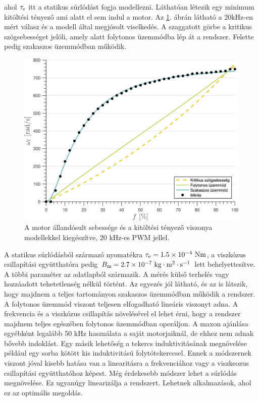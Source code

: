 ahol \(\tau_{\mathrm{e}}\) itt a statikus súrlódást fogja modellezni. Láthatóan létezik egy minimum kitöltési tényező 
ami alatt el sem indul a motor. 
Az \ref{fig:motor_response_20khz_with_model}. ábrán látható a 20kHz-en mért válasz és a modell által megjósolt viselkedés. 
A szaggatott görbe a kritikus szögsebességet jelöli, amely alatt folytonos üzemmódba lép át a rendszer. Felette pedig szakaszos üzemmódban működik. 
\begin{figure}[H]
    \begin{center}
    \includegraphics[width=\textwidth]{images/motor_pwm_response20_with_model.png}
    \caption{A motor állandósult sebessége és a kitöltési tényező viszonya modellekkel kiegészítve, 20 kHz-es PWM jellel.}\label{fig:motor_response_20khz_with_model}
    \end{center}
\end{figure}
A statikus súrlódásból származó nyomatékra \(\tau_{\mathrm{e}} = 1.5 \times 10^{-4}~\mathrm{Nm}\), a viszkózus csillapítási együtthatóra pedig 
\(B_{\mathrm{m}} = 2.7 \times 10^{-7}~\mathrm{kg \cdot m^2 \cdot s^{-1}}\) lett behelyettesítve. A többi paraméter az adatlapból származik. 
A mérés külső terhelés vagy hozzáadott tehetetlenség nélkül történt. Az egyezés jól látható, és az is látszik, hogy majdnem a 
teljes tartományon szakaszos üzemmódban működik a rendszer. A folytonos üzemmód viszont teljesen elfogadható 
lineáris viszonyt adna. A frekvencia és a viszkózus csillapítás növelésével el lehet érni, hogy a rendszer majdnem teljes 
egészében folytonos üzemmódban operáljon. A maxon ajánlása egyébként legalább 50 kHz használata a saját motorjaiknál, 
de ehhez nem adnak bővebb indoklást. Egy másik lehetőség a tekercs induktivitásának megnövelése például egy sorba kötött kis 
induktivitású folytótekerccsel. Ennek a módszernek viszont jóval kisebb hatása van a linearitásra a frekvenciához vagy a 
viszkeozus csillapítási együtthatóhoz képest. Még érdekesebb módszer lehet a súrlódás megnövelése. Ez ugyanúgy linearizálja a rendszert. 
Lehetnek alkalmazások, ahol ez az optimális megoldás. 

